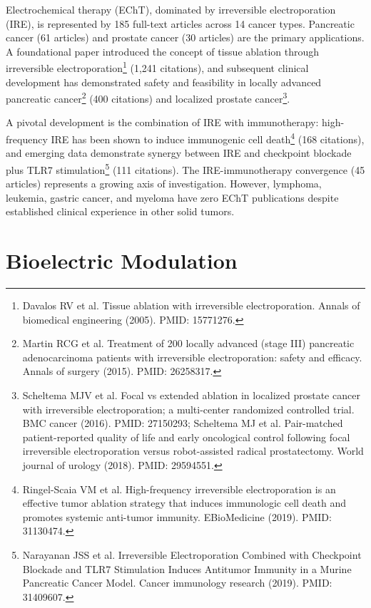 \documentclass[11pt,twoside,openright]{report}
\begin{document}
Electrochemical therapy (EChT), dominated by irreversible electroporation (IRE), is represented by 185 full-text articles across 14 cancer types. Pancreatic cancer (61 articles) and prostate cancer (30 articles) are the primary applications. A foundational paper introduced the concept of tissue ablation through irreversible electroporation\footnote{Davalos RV et al. Tissue ablation with irreversible electroporation. Annals of biomedical engineering (2005). PMID: 15771276.} (1,241 citations), and subsequent clinical development has demonstrated safety and feasibility in locally advanced pancreatic cancer\footnote{Martin RCG et al. Treatment of 200 locally advanced (stage III) pancreatic adenocarcinoma patients with irreversible electroporation: safety and efficacy. Annals of surgery (2015). PMID: 26258317.} (400 citations) and localized prostate cancer\footnote{Scheltema MJV et al. Focal vs extended ablation in localized prostate cancer with irreversible electroporation; a multi-center randomized controlled trial. BMC cancer (2016). PMID: 27150293; Scheltema MJ et al. Pair-matched patient-reported quality of life and early oncological control following focal irreversible electroporation versus robot-assisted radical prostatectomy. World journal of urology (2018). PMID: 29594551.}.

A pivotal development is the combination of IRE with immunotherapy: high-frequency IRE has been shown to induce immunogenic cell death\footnote{Ringel-Scaia VM et al. High-frequency irreversible electroporation is an effective tumor ablation strategy that induces immunologic cell death and promotes systemic anti-tumor immunity. EBioMedicine (2019). PMID: 31130474.} (168 citations), and emerging data demonstrate synergy between IRE and checkpoint blockade plus TLR7 stimulation\footnote{Narayanan JSS et al. Irreversible Electroporation Combined with Checkpoint Blockade and TLR7 Stimulation Induces Antitumor Immunity in a Murine Pancreatic Cancer Model. Cancer immunology research (2019). PMID: 31409607.} (111 citations). The IRE-immunotherapy convergence (45 articles) represents a growing axis of investigation. However, lymphoma, leukemia, gastric cancer, and myeloma have zero EChT publications despite established clinical experience in other solid tumors.

\section{Bioelectric Modulation}
\end{document}
